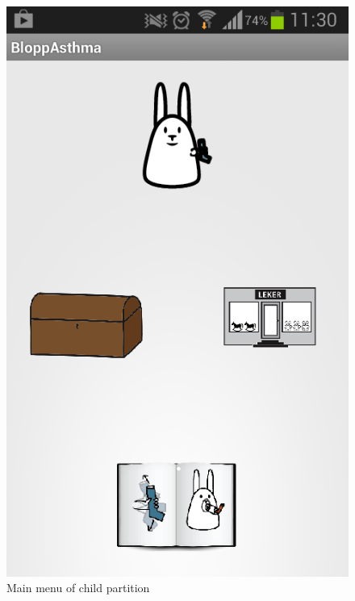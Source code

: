 \begin{figure}
	\begin{minipage}[t]{0.25\linewidth}
		\centering
			\includegraphics[width=0.20\paperwidth]{Pictures/new-screenshots/kid-menu.png}
		\caption{Main menu of child partition}
		\label{fig:child-menu}
	\end{minipage}
	\hspace{1cm}
	\begin{minipage}[t]{0.25\linewidth}
		\centering

\end{minipage}
\end{figure}
